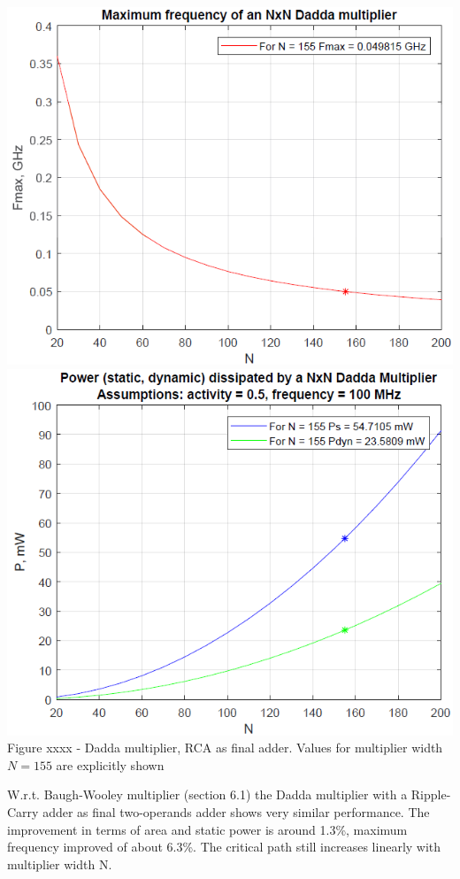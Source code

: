 \documentclass[11pt]{article} %
\begin{document}
\begin{center}
\includegraphics[scale=.48]{fmax_dadda_rca.PNG}
\includegraphics[scale=.48]{power_dadda_rca.PNG}
\small{Figure xxxx - Dadda multiplier, RCA as final adder. Values for multiplier width $N=155$ are explicitly shown}
\end{center}
\vspace{1em}
W.r.t. Baugh-Wooley multiplier (section 6.1) the Dadda multiplier with a Ripple-Carry adder as final two-operands adder shows very similar performance. The improvement in terms of area and static power is around 1.3\%, maximum frequency improved of about 6.3\%.
The critical path still increases linearly with multiplier width N.
\newpage
\end{document}
